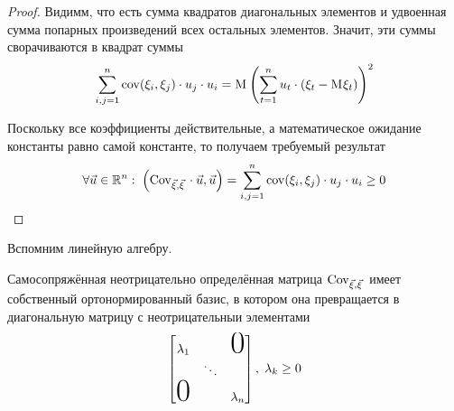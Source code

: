 \begin{enumerate}
\begin{proof}
            Видимм, что есть сумма квадратов диагональных элементов
            и удвоенная сумма попарных произведений всех остальных элементов.
            Значит, эти суммы сворачиваются в квадрат суммы
            $$\sum_{i,j=1}^{n} \mathrm{cov}\!\left( \xi_i, \xi_j \right) \cdot u_j \cdot u_i
                = \mathrm{M}_{} \left( \sum_{t=1}^{n} u_t
                    \cdot \left( \xi_t - \mathrm{M}_{} \xi_t \right) \right)^2$$

            Поскольку все коэффициенты действительные, а математическое
            ожидание константы равно самой константе, то получаем требуемый
            результат
            $$\forall \vec{u} \in \mathbb{R}^n:\;
                \left( \mathrm{Cov}_{\vec{\xi}, \vec{\xi}}\, \cdot \vec{u}, \vec{u} \right)
                = \sum_{i,j=1}^{n} \mathrm{cov}\!\left( \xi_i, \xi_j \right) \cdot u_j \cdot u_i
                \ge 0$$
        \end{proof}
\end{enumerate}

\begin{remark}
    Вспомним линейную алгебру.

    Самосопряжённая неотрицательно определённая матрица $\mathrm{Cov}_{\vec{\xi}, \vec{\xi}}\,$ имеет
    собственный ортонормированный базис, в котором она превращается в диагональную
    матрицу с неотрицательныи элементами
    $$\begin{bmatrix}
        \lambda_1 & & \mbox{\Huge{0}} \\
         & \ddots &  \\
         \mbox{\Huge{0}} & & \lambda_n
    \end{bmatrix},\; \lambda_k \ge 0$$
\end{remark}
